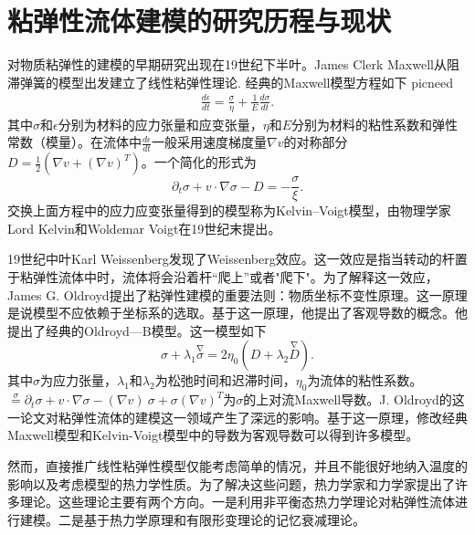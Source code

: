 \documentclass{article}
\begin{document}
\section{粘弹性流体建模的研究历程与现状}
对物质粘弹性的建模的早期研究出现在19世纪下半叶。James Clerk Maxwell从阻滞弹簧的模型出发建立了线性粘弹性理论\cite{maxwell2013scientific}. 经典的Maxwell模型方程如下
picneed
\begin{eqnarray*}
\frac {d\epsilon} {dt} = \frac {\sigma} {\eta} + \frac {1} {E} \frac {d\sigma} {dt}.
\end{eqnarray*}
其中$\sigma$和$\epsilon$分别为材料的应力张量和应变张量，$\eta$和$E$分别为材料的粘性系数和弹性常数（模量）。在流体中$\frac {d\epsilon} {dt}$一般采用速度梯度量$\nabla v$的对称部分$D=\frac{1}{2} (\nabla v + (\nabla v)^T)$。一个简化的形式为
\begin{equation} \label{eq:maxwell}
			\partial_t \sigma + v \cdot \nabla \sigma - D = -\frac{\sigma}{\xi}. 
\end{equation}
交换上面方程中的应力应变张量得到的模型称为Kelvin–Voigt模型，由物理学家Lord Kelvin和Woldemar Voigt在19世纪末提出\cite{kelvin1887stability}。

19世纪中叶Karl Weissenberg发现了Weissenberg效应。这一效应是指当转动的杆置于粘弹性流体中时，流体将会沿着杆“爬上”或者"爬下"\cite{weissenberg1947continuum}。为了解释这一效应，James G. Oldroyd提出了粘弹性建模的重要法则：物质坐标不变性原理。这一原理是说模型不应依赖于坐标系的选取。基于这一原理，他提出了客观导数的概念。他提出了经典的Oldroyd—B模型。这一模型如下
\begin{equation} \label{eq:Oldroyd}
	{\sigma} + \lambda_1 \stackrel{\nabla}{{\sigma}} = 2\eta_0 ({D} + \lambda_2 \stackrel{\nabla}{{D}}).
\end{equation}
其中$\sigma$为应力张量，$\lambda_1$和$\lambda_2$为松弛时间和迟滞时间，$\eta_0$为流体的粘性系数。$\stackrel{\sigma} = \partial_t \sigma + v \cdot \nabla \sigma - (\nabla v)\  \sigma + \sigma (\nabla v)^T$为$\sigma$的上对流Maxwell导数\cite{oldroyd1950formulation}。J. Oldroyd的这一论文对粘弹性流体的建模这一领域产生了深远的影响。基于这一原理，修改经典Maxwell模型和Kelvin-Voigt模型中的导数为客观导数可以得到许多模型\cite{lin2005hydrodynamics,larson1999structure}。

然而，直接推广线性粘弹性模型仅能考虑简单的情况，并且不能很好地纳入温度的影响以及考虑模型的热力学性质。为了解决这些问题，热力学家和力学家提出了许多理论。这些理论主要有两个方向。一是利用非平衡态热力学理论对粘弹性流体进行建模\cite{jou1996extended,ottinger2005beyond,zhu2014conservation}。二是基于热力学原理和有限形变理论的记忆衰减理论\cite{coleman1961foundations,truesdell2012rational}。
\end{document}
